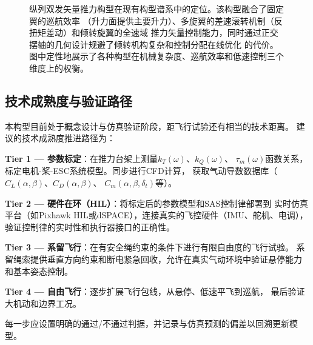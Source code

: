 \documentclass[a4paper,12pt]{ctexart}
\theoremstyle{plain}
\theoremstyle{definition}
\begin{document}
\begin{figure}[H]
\caption{纵列双发矢量推力构型在现有构型谱系中的定位。该构型融合了固定翼的巡航效率
（升力面提供主要升力）、多旋翼的差速滚转机制（反扭矩差动）和倾转旋翼的全速域
推力矢量控制能力，同时通过正交摆轴的几何设计规避了倾转机构复杂和控制分配在线优化
的代价。图中定性地展示了各种构型在机械复杂度、巡航效率和低速控制三个维度上的权衡。}
\label{fig:config_comparison}
\end{figure}

\subsection{技术成熟度与验证路径}
\label{sec:verification}

本构型目前处于概念设计与仿真验证阶段，距飞行试验还有相当的技术距离。
建议的技术成熟度推进路径为：

\textbf{Tier 1 — 参数标定}：在推力台架上测量$k_T(\omega)$、$k_Q(\omega)$、
$\tau_m(\omega)$函数关系，标定电机-桨-ESC系统模型。同步进行CFD计算，
获取气动导数数据库（$C_L(\alpha,\beta)$、$C_D(\alpha,\beta)$、
$C_m(\alpha,\beta,\delta_t)$等）。

\textbf{Tier 2 — 硬件在环（HIL）}：将标定后的参数模型和SAS控制律部署到
实时仿真平台（如Pixhawk HIL或dSPACE），连接真实的飞控硬件（IMU、舵机、电调），
验证控制律的实时性和执行器接口的正确性。

\textbf{Tier 3 — 系留飞行}：在有安全绳约束的条件下进行有限自由度的飞行试验。
系留绳索提供垂直方向约束和断电紧急回收，允许在真实气动环境中验证悬停能力
和基本姿态控制。

\textbf{Tier 4 — 自由飞行}：逐步扩展飞行包线，从悬停、低速平飞到巡航，
最后验证大机动和边界工况。

每一步应设置明确的通过/不通过判据，并记录与仿真预测的偏差以回溯更新模型。
\end{document}
